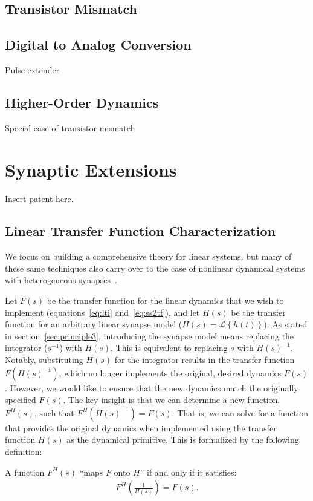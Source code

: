 \subsection{Transistor Mismatch}

\subsection{Digital to Analog Conversion}

Pulse-extender

\subsection{Higher-Order Dynamics}

Special case of transistor mismatch


\section{Synaptic Extensions}

Insert patent here.

\subsection{Linear Transfer Function Characterization}

We focus on building a comprehensive theory for linear systems, but many of these same techniques also carry over to the case of nonlinear dynamical systems with heterogeneous synapses~\citep{voelker2017iscas, voelker2017neuromorphic}.

Let $F(s)$ be the transfer function for the linear dynamics that we wish to implement (equations~\ref{eq:lti} and~\ref{eq:ss2tf}), and let $H(s)$ be the transfer function for an arbitrary linear synapse model ($H(s) = \mathcal{L} \left\{ h(t) \right\}$).
As stated in section~\ref{sec:principle3}, introducing the synapse model means replacing the integrator ($s^{-1}$) with $H(s)$.
This is equivalent to replacing $s$ with $H(s)^{-1}$.
Notably, substituting $H(s)$ for the integrator results in the transfer function $F \left( H(s)^{-1} \right)$, which no longer implements the original, desired dynamics $F(s)$. %
However, we would like to ensure that the new dynamics match the originally specified $F(s)$.
The key insight is that we can determine a new function, $F^H(s)$, such that $F^{H}\left( H(s)^{-1} \right) = F(s)$.
That is, we can solve for a function that provides the original dynamics when implemented using the transfer function $H(s)$ as the dynamical primitive.
This is formalized by the following definition:
\begin{definition} \label{def:maps-onto}
A function $F^{H}(s)$ ``maps $F$ onto $H$'' if and only if it satisfies:
\begin{align} \label{eq:maps-onto}
F^{H}\left( \frac{1}{H(s)} \right) = F(s) \text{.}
\end{align}
\end{definition}

